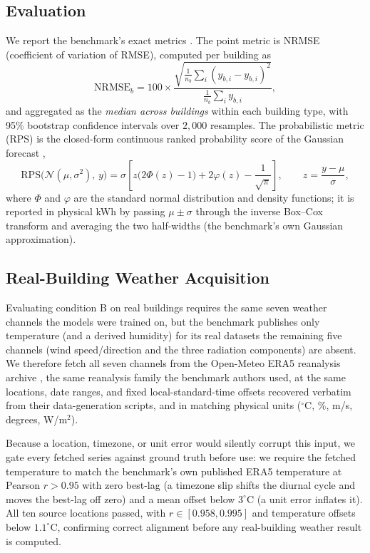 \documentclass[11pt]{article}
\begin{document}
\subsection{Evaluation}
\label{sec:evaluation}
We report the benchmark's exact metrics \citep{buildingsbench2023}. The point
metric is NRMSE (coefficient of variation of RMSE), computed per building as
\begin{equation}
\mathrm{NRMSE}_b = 100 \times
\frac{\sqrt{\frac{1}{n_b}\sum_i (\hat{y}_{b,i}-y_{b,i})^2}}
     {\frac{1}{n_b}\sum_i y_{b,i}},
\label{eq:nrmse}
\end{equation}
and aggregated as the \emph{median across buildings} within each building type,
with 95\% bootstrap confidence intervals over $2{,}000$ resamples. The
probabilistic metric (RPS) is the closed-form continuous ranked probability score
of the Gaussian forecast \citep{gneiting2007},
\begin{equation}
\mathrm{RPS}\big(\mathcal{N}(\mu,\sigma^{2}),\,y\big)=
\sigma\left[z\big(2\Phi(z)-1\big)+2\varphi(z)-\frac{1}{\sqrt{\pi}}\right],
\qquad z=\frac{y-\mu}{\sigma},
\label{eq:crps}
\end{equation}
where $\Phi$ and $\varphi$ are the standard normal distribution and density
functions; it is reported in physical kWh by passing $\mu\pm\sigma$ through the
inverse Box--Cox transform and averaging the two half-widths (the benchmark's own
Gaussian approximation).

\subsection{Real-Building Weather Acquisition}
\label{sec:weather-data}
Evaluating condition B on real buildings requires the same seven weather channels
the models were trained on, but the benchmark publishes only temperature (and a
derived humidity) for its real datasets the remaining five channels (wind
speed/direction and the three radiation components) are absent. We therefore fetch
all seven channels from the Open-Meteo ERA5 reanalysis archive
\citep{openmeteo,era5}, the same reanalysis family the benchmark authors used, at
the same locations, date ranges, and fixed local-standard-time offsets recovered
verbatim from their data-generation scripts, and in matching physical units
($^\circ$C, \%, m/s, degrees, W/m$^2$).

Because a location, timezone, or unit error would silently corrupt this input, we
gate every fetched series against ground truth before use: we require the fetched
temperature to match the benchmark's own published ERA5 temperature at Pearson
$r>0.95$ with zero best-lag (a timezone slip shifts the diurnal cycle and moves the
best-lag off zero) and a mean offset below $3^\circ$C (a unit error inflates it).
All ten source locations passed, with $r\in[0.958,0.995]$ and temperature offsets
below $1.1^\circ$C, confirming correct alignment before any real-building weather
result is computed.
\end{document}
